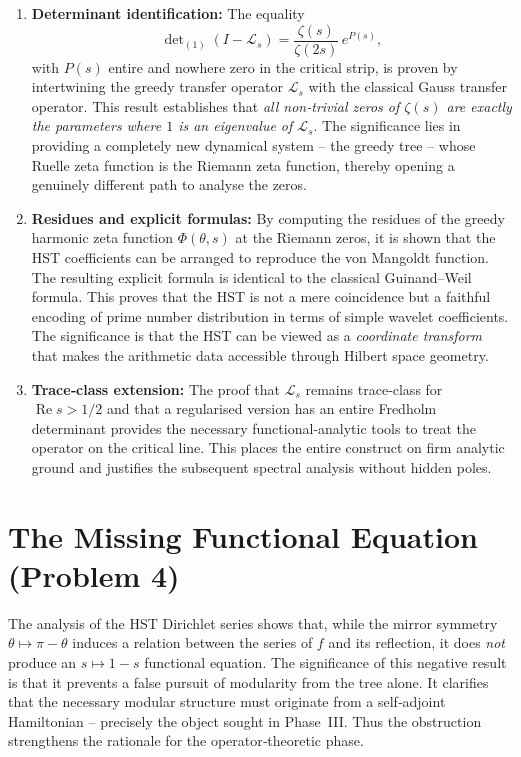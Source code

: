 \documentclass[11pt,a4paper]{article}
\theoremstyle{remark}
\newcommand{\cL}{\mathcal{L}}
\begin{document}
\begin{enumerate}[label=\textbf{P\arabic*:}]
\item \textbf{Determinant identification:} The equality
\[
\det\nolimits_{(1)}(I-\cL_s)=\frac{\zeta(s)}{\zeta(2s)}\,e^{P(s)},
\]
with $P(s)$ entire and nowhere zero in the critical strip, is proven by intertwining the greedy transfer operator $\cL_s$ with the classical Gauss transfer operator. This result establishes that \emph{all non‑trivial zeros of $\zeta(s)$ are exactly the parameters where $1$ is an eigenvalue of $\cL_s$}. The significance lies in providing a completely new dynamical system -- the greedy tree -- whose Ruelle zeta function is the Riemann zeta function, thereby opening a genuinely different path to analyse the zeros.

\item \textbf{Residues and explicit formulas:} By computing the residues of the greedy harmonic zeta function $\Phi(\theta,s)$ at the Riemann zeros, it is shown that the HST coefficients can be arranged to reproduce the von Mangoldt function. The resulting explicit formula is identical to the classical Guinand--Weil formula. This proves that the HST is not a mere coincidence but a faithful encoding of prime number distribution in terms of simple wavelet coefficients. The significance is that the HST can be viewed as a \emph{coordinate transform} that makes the arithmetic data accessible through Hilbert space geometry.

\item \textbf{Trace‑class extension:} The proof that $\cL_s$ remains trace‑class for $\operatorname{Re}s>1/2$ and that a regularised version has an entire Fredholm determinant provides the necessary functional‑analytic tools to treat the operator on the critical line. This places the entire construct on firm analytic ground and justifies the subsequent spectral analysis without hidden poles.
\end{enumerate}

\section{The Missing Functional Equation (Problem 4)}
The analysis of the HST Dirichlet series shows that, while the mirror symmetry $\theta\mapsto\pi-\theta$ induces a relation between the series of $f$ and its reflection, it does \emph{not} produce an $s\mapsto 1-s$ functional equation. The significance of this negative result is that it prevents a false pursuit of modularity from the tree alone. It clarifies that the necessary modular structure must originate from a self‑adjoint Hamiltonian -- precisely the object sought in Phase~III. Thus the obstruction strengthens the rationale for the operator‑theoretic phase.
\end{document}
